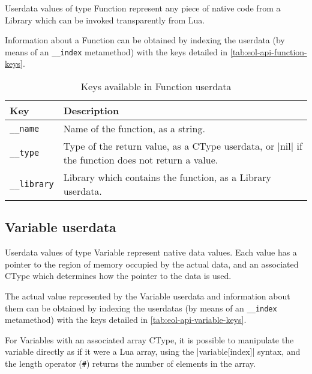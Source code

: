 Userdata values of type \textsf{Function} represent any piece of native code
from a \textsf{Library} which can be invoked transparently from Lua.

Information about a \textsf{Function} can be obtained by indexing the userdata
(by means of an \texttt{\_\_index} metamethod) with the keys detailed in
\autoref{tab:eol-api-function-keys}.

\begin{table}[ht]
	\centering
	\begin{tabular}{lp{}}
		\toprule
		Key & Description \\
		\midrule
		\texttt{\_\_name} & Name of the function, as a string. \\
		\texttt{\_\_type} & Type of the return value, as a \textsf{CType}
			userdata, or \Mlua|nil| if the function does not return a value. \\
		\texttt{\_\_library} & Library which contains the function, as a
			\textsf{Library} userdata. \\
		\bottomrule
	\end{tabular}
	\caption{Keys available in \textsf{Function} userdata}
	\label{tab:eol-api-function-keys}
\end{table}


\subsection{Variable userdata}
	\label{sec:eol-api-variable-t}

Userdata values of type \textsf{Variable} represent native data values. Each
value has a pointer to the region of memory occupied by the actual data, and
an associated \textsf{CType} which determines how the pointer to the data is
used.

The actual value represented by the \textsf{Variable} userdata and information
about them can be obtained by indexing the userdatas (by means of an
\texttt{\_\_index} metamethod) with the keys detailed in
\autoref{tab:eol-api-variable-keys}.

For \textsf{Variable}s with an associated array \textsf{CType}, it is possible
to manipulate the variable directly as if it were a Lua array, using the
\Mlua|variable[index]| syntax, and the length operator (\texttt\#) returns
the number of elements in the array.

%

